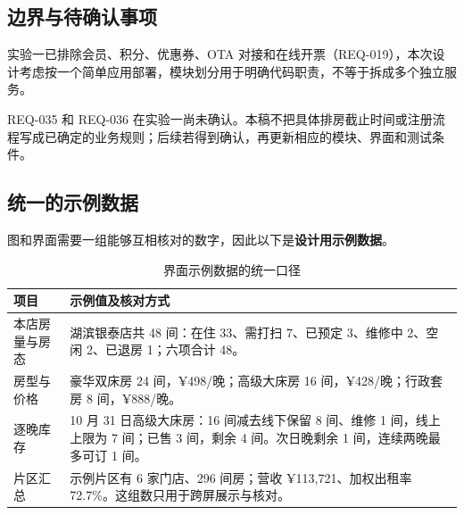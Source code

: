 \subsection{边界与待确认事项}

实验一已排除会员、积分、优惠券、OTA 对接和在线开票（REQ-019），本次设计考虑按一个简单应用部署，模块划分用于明确代码职责，不等于拆成多个独立服务。

REQ-035 和 REQ-036 在实验一尚未确认。本稿不把具体排房截止时间或注册流程写成已确定的业务规则；后续若得到确认，再更新相应的模块、界面和测试条件。

\subsection{统一的示例数据}

图和界面需要一组能够互相核对的数字，因此以下是\textbf{设计用示例数据}。

\begin{table}[H]
\centering
\caption{界面示例数据的统一口径}
\tabfont
\begin{tabularx}{\textwidth}{@{}L{2.5cm}X@{}}
\toprule
项目 & 示例值及核对方式 \\
\midrule
本店房量与房态 & 湖滨银泰店共 48 间：在住 33、需打扫 7、已预定 3、维修中 2、空闲 2、已退房 1；六项合计 48。 \\
房型与价格 & 豪华双床房 24 间，¥498/晚；高级大床房 16 间，¥428/晚；行政套房 8 间，¥888/晚。 \\
逐晚库存 & 10 月 31 日高级大床房：16 间减去线下保留 8 间、维修 1 间，线上上限为 7 间；已售 3 间，剩余 4 间。次日晚剩余 1 间，连续两晚最多可订 1 间。 \\
片区汇总 & 示例片区有 6 家门店、296 间房；营收 ¥113,721、加权出租率 72.7\%。这组数只用于跨屏展示与核对。 \\
\bottomrule
\end{tabularx}
\end{table}

